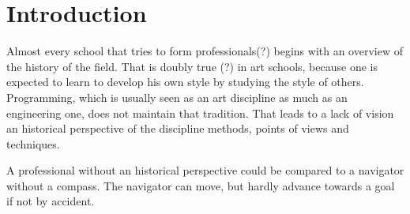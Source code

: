 \section{Introduction}

Almost every school that tries to form professionals(?) begins with an
overview of the history of the field. That is doubly true (?) in art
schools, because one is expected to learn to develop his own style by
studying the style of others. Programming, which is usually seen as an
art discipline as much as an engineering one, does not maintain that
tradition. That leads to a lack of vision an historical perspective of
the discipline methods, points of views and techniques.

A professional without an historical perspective could be compared to
a navigator without a compass. The navigator can move, but hardly
advance towards a goal if not by accident. 


